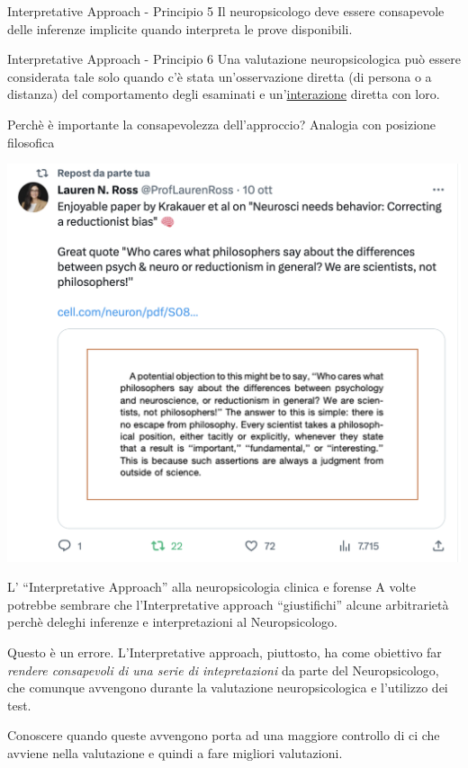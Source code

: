 \documentclass[
  ignorenonframetext,
]{beamer}
\begin{document}
\begin{frame}{Interpretative Approach - Principio 5}
\label{interpretative-approach---principio-5}
Il neuropsicologo deve essere consapevole delle inferenze implicite
quando interpreta le prove disponibili.
\end{frame}

\begin{frame}{Interpretative Approach - Principio 6}
\label{interpretative-approach---principio-6}
Una valutazione neuropsicologica può essere considerata tale solo quando
c'è stata un'osservazione diretta (di persona o a distanza) del
comportamento degli esaminati e un'\underline{interazione} diretta con
loro.
\end{frame}

\begin{frame}{Perchè è importante la consapevolezza dell'approccio?}
\label{perchuxe8-uxe8-importante-la-consapevolezza-dellapproccio}
Analogia con posizione filosofica

\begin{center}
\includegraphics[width=\linewidth,height=0.7\textheight,keepaspectratio]{Figures/Ross_Twitter.png}
\end{center}
\end{frame}

\begin{frame}{L' ``Interpretative Approach'' alla neuropsicologia
clinica e forense}
\label{l-interpretative-approach-alla-neuropsicologia-clinica-e-forense}
A volte potrebbe sembrare che l'Interpretative approach ``giustifichi''
alcune arbitrarietà perchè deleghi inferenze e interpretazioni al
Neuropsicologo.

Questo è un errore. L'Interpretative approach, piuttosto, ha come
obiettivo far \emph{rendere consapevoli di una serie di intepretazioni}
da parte del Neuropsicologo, che comunque avvengono durante la
valutazione neuropsicologica e l'utilizzo dei test.

Conoscere quando queste avvengono porta ad una maggiore controllo di ci
che avviene nella valutazione e quindi a fare migliori valutazioni.
\end{frame}
\end{document}
